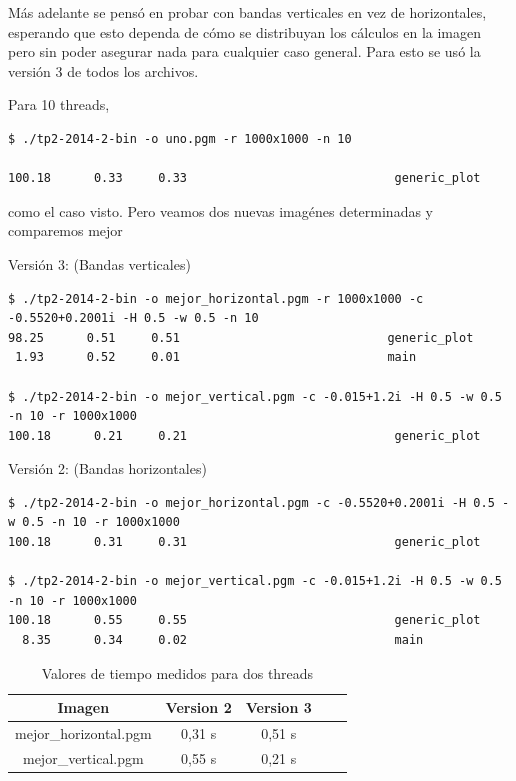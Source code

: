 \documentclass[a4paper,10pt]{article}
\begin{document}
Más adelante se pensó en probar con bandas verticales en vez de horizontales, esperando que esto dependa de cómo se distribuyan los cálculos en la imagen pero sin poder asegurar nada para cualquier caso general.
Para esto se usó la versión 3 de todos los archivos.

Para 10 threads,
\begin{verbatim}
$ ./tp2-2014-2-bin -o uno.pgm -r 1000x1000 -n 10

100.18      0.33     0.33                             generic_plot
\end{verbatim}

como el caso visto.
Pero veamos dos nuevas imagénes determinadas y comparemos mejor

Versión 3: (Bandas verticales)
\begin{verbatim}
$ ./tp2-2014-2-bin -o mejor_horizontal.pgm -r 1000x1000 -c -0.5520+0.2001i -H 0.5 -w 0.5 -n 10
98.25      0.51     0.51                             generic_plot
 1.93      0.52     0.01                             main

$ ./tp2-2014-2-bin -o mejor_vertical.pgm -c -0.015+1.2i -H 0.5 -w 0.5 -n 10 -r 1000x1000
100.18      0.21     0.21                             generic_plot
\end{verbatim}

Versión 2: (Bandas horizontales)
\begin{verbatim}
$ ./tp2-2014-2-bin -o mejor_horizontal.pgm -c -0.5520+0.2001i -H 0.5 -w 0.5 -n 10 -r 1000x1000
100.18      0.31     0.31                             generic_plot

$ ./tp2-2014-2-bin -o mejor_vertical.pgm -c -0.015+1.2i -H 0.5 -w 0.5 -n 10 -r 1000x1000
100.18      0.55     0.55                             generic_plot
  8.35      0.34     0.02                             main
\end{verbatim}

\begin{table} [htbHp]
\begin{center}
\begin{tabular}{|c|c|c|c|c|}\hline
Imagen	&Version 2	&Version 3	\\\hline
mejor\_horizontal.pgm	&0,31 s	&0,51 s	\\\hline
mejor\_vertical.pgm	&0,55 s	&0,21 s	\\\hline
\end{tabular}
\end{center}
\caption{Valores de tiempo medidos para dos threads}
\end{table}
\end{document}
